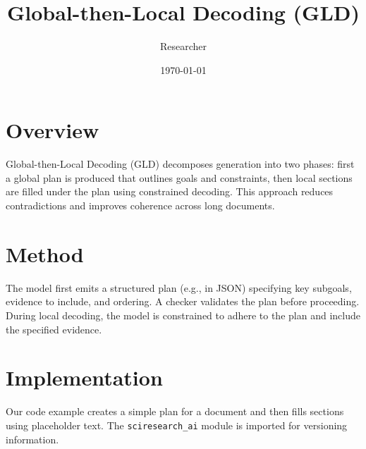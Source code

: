 \documentclass{article}
\title{Global-then-Local Decoding (GLD)}
\author{Researcher}
\date{\today}
\begin{document}
\maketitle

\section{Overview}
Global-then-Local Decoding (GLD) decomposes generation into two phases:
first a global plan is produced that outlines goals and constraints,
then local sections are filled under the plan using constrained decoding.
This approach reduces contradictions and improves coherence across long
documents.

\section{Method}
The model first emits a structured plan (e.g., in JSON) specifying
key subgoals, evidence to include, and ordering. A checker validates the
plan before proceeding. During local decoding, the model is constrained
to adhere to the plan and include the specified evidence.

\section{Implementation}
Our code example creates a simple plan for a document and then fills
sections using placeholder text. The \texttt{sciresearch\_ai} module is
imported for versioning information.
\end{document}
